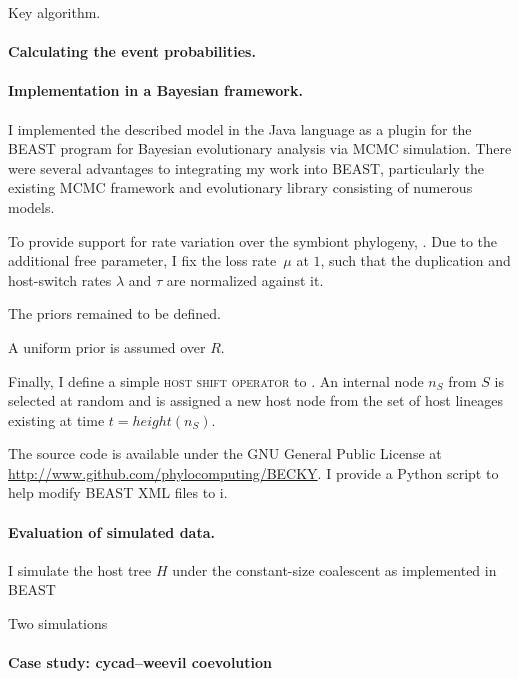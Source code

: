 \documentclass[12pt,letterpaper]{article}
\begin{document}
\begin{algorithm}
\caption{Key algorithm.}
\end{algorithm}



\paragraph*{Calculating the event probabilities.} 


\paragraph*{Implementation in a Bayesian framework.}

I implemented the described model in the Java language as a plugin for the BEAST program \parencite{Drummond:2012} for Bayesian evolutionary analysis via \ac{MCMC} simulation. There were several advantages to integrating my work into BEAST, particularly the existing \ac{MCMC} framework and evolutionary library consisting of numerous models.

To provide support for rate variation over the symbiont phylogeny, . Due to the additional free parameter, I fix the loss rate~$\mu$ at $1$, such that the duplication and host-switch rates $\lambda$ and $\tau$ are normalized against it.

The priors remained to be defined.

A uniform prior is assumed over $R$.

Finally, I define a simple \textsc{host shift operator} to . An internal node $n_S$ from $S$ is selected at random and is assigned a new host node from the set of host lineages existing at time $t = height(n_S)$.\

The source code is available under the GNU General Public License at \url{http://www.github.com/phylocomputing/BECKY}. I provide a Python script to help modify BEAST XML files to i.

\paragraph*{Evaluation of simulated data.}

I simulate the host tree $H$ under the constant-size coalescent \parencite{Kingman:1982} as implemented in BEAST \parencite{Drummmond:2012}

Two simulations

\paragraph*{Case study: cycad--weevil coevolution}
\end{document}
